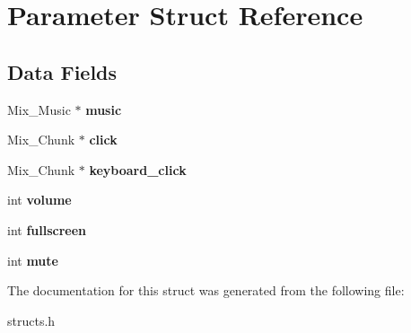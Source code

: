 \hypertarget{structParameter}{}\section{Parameter Struct Reference}
\label{structParameter}
\subsection*{Data Fields}
\begin{DoxyCompactItemize}
\item 
\mbox{\label{structParameter_aa7dbc1acec97da51a2a4e6346d890b4f}} 
Mix\+\_\+\+Music $\ast$ {\bfseries music}
\item 
\mbox{\label{structParameter_a48918a3e4a9514cffb9b59dd85c511cd}} 
Mix\+\_\+\+Chunk $\ast$ {\bfseries click}
\item 
\mbox{\label{structParameter_ae04ba3c3bdee5642a2d591e256823d3e}} 
Mix\+\_\+\+Chunk $\ast$ {\bfseries keyboard\+\_\+click}
\item 
\mbox{\label{structParameter_a8041ac8b22ef7c28648ae0d0ebc61698}} 
int {\bfseries volume}
\item 
\mbox{\label{structParameter_a51bd6883effe03e02ff0f262b47c724a}} 
int {\bfseries fullscreen}
\item 
\mbox{\label{structParameter_aacb7d19d4e42e7880c3606629b08bfa5}} 
int {\bfseries mute}
\end{DoxyCompactItemize}


The documentation for this struct was generated from the following file\+:\begin{DoxyCompactItemize}
\item 
structs.\+h\end{DoxyCompactItemize}
